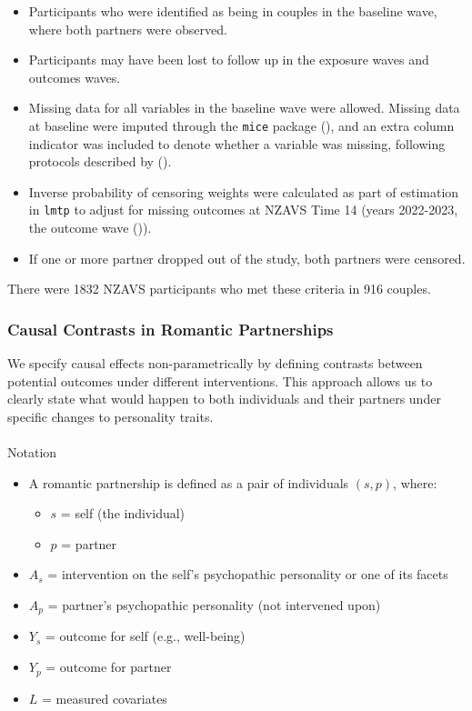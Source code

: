 \documentclass[
  single column]{article}
\makeatletter
\let\oldparagraph\paragraph
\renewcommand{\paragraph}{
    \@ifstar
      \xxxParagraphStar
      \xxxParagraphNoStar
  }
\newcommand{\xxxParagraphStar}[1]{\oldparagraph*{#1}\mbox{}}
\newcommand{\xxxParagraphNoStar}[1]{\oldparagraph{#1}\mbox{}}
\providecommand{\tightlist}{%
  \setlength{\itemsep}{0pt}\setlength{\parskip}{0pt}}\usepackage{longtable,booktabs,array}
\makeatother
\begin{document}
\begin{itemize}
\tightlist
\item
  Participants who were identified as being in couples in the baseline
  wave, where both partners were observed.
\item
  Participants may have been lost to follow up in the exposure waves and
  outcomes waves.
\item
  Missing data for all variables in the baseline wave were allowed.
  Missing data at baseline were imputed through the \texttt{mice}
  package (), and an extra
  column indicator was included to denote whether a variable was
  missing, following protocols described by
  ().
\item
  Inverse probability of censoring weights were calculated as part of
  estimation in \texttt{lmtp} to adjust for missing outcomes at NZAVS
  Time 14 (years 2022-2023, the outcome wave
  ()).
\item
  If one or more partner dropped out of the study, both partners were
  censored.
\end{itemize}

There were 1832 NZAVS participants who met these criteria in 916
couples.

\subsubsection{Causal Contrasts in Romantic
Partnerships}\label{causal-contrasts-in-romantic-partnerships}

We specify causal effects non-parametrically by defining contrasts
between potential outcomes under different interventions. This approach
allows us to clearly state what would happen to both individuals and
their partners under specific changes to personality traits.

\paragraph{Notation}\label{notation}

\begin{itemize}
\tightlist
\item
  A romantic partnership is defined as a pair of individuals \((s, p)\),
  where:

  \begin{itemize}
  \tightlist
  \item
    \(s\) = self (the individual)
  \item
    \(p\) = partner
  \end{itemize}
\item
  \(A_s\) = intervention on the self's psychopathic personality or one
  of its facets
\item
  \(A_p\) = partner's psychopathic personality (not intervened upon)
\item
  \(Y_s\) = outcome for self (e.g., well-being)
\item
  \(Y_p\) = outcome for partner
\item
  \(L\) = measured covariates
\end{itemize}
\end{document}
